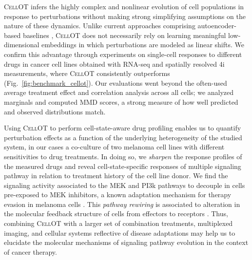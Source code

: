  \textsc{CellOT} infers the highly complex and nonlinear evolution of cell populations in response to perturbations without making strong simplifying assumptions on the nature of these dynamics.
Unlike current approaches comprising autoencoder-based baselines \citep{lopez2018scvi, lotfollahi2019scgen, yang2020predicting}, \textsc{CellOT} does not necessarily rely on learning meaningful low-dimensional embeddings in which perturbations are modeled as linear shifts. %
We confirm this advantage through experiments on single-cell responses to different drugs in cancer cell lines obtained with RNA-seq and spatially resolved 4i measurements, where \textsc{CellOT} consistently outperforms (Fig.~\ref{fig:benchmark_cellot}). Our evaluations went beyond the often-used average treatment effect and correlation analysis across all cells; we analyzed marginals
and computed MMD scores, a strong measure of how well predicted and observed distributions match.

\smallskip

 Using \textsc{CellOT} to perform cell-state-aware drug profiling enables us to quantify perturbation effects as a function of the underlying heterogeneity of the studied system, in our cases a co-culture of two melanoma cell lines with different sensitivities to drug treatments. In doing so, we \textit{sharpen} the response profiles of the measured drugs and reveal cell-state-specific responses of multiple signaling pathway in relation to treatment history of the cell line donor. We find the signaling activity associated to the MEK and PI3k pathways to decouple in cells pre-exposed to MEK inhibitors, a known adaptation mechanism for therapy evasion in melanoma cells \citep{kun2021mek}. This \textit{pathway rewiring} is associated to alteration in the molecular feedback structure of cells from effectors to receptors \citep{kun2021mek, turke2012mek}. Thus, combining \textsc{CellOT} with a larger set of combination treatments, multiplexed imaging, and cellular systems reflective of disease adaptations may help us to elucidate the molecular mechanisms of signaling pathway evolution in the context of cancer therapy. 

\smallskip


